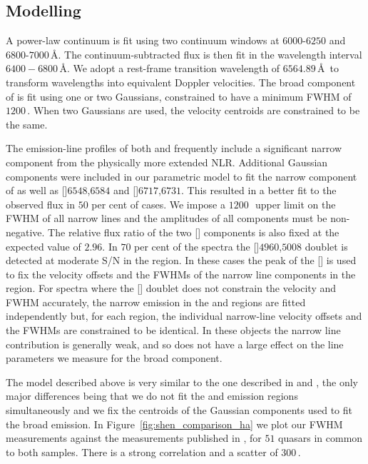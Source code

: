 \subsection{Modelling \ha}
\label{sec:ha}

A power-law continuum is fit using two continuum windows at $6000$-$6250$ and $6800$-$7000$\,\AA.
The continuum-subtracted flux is then fit in the wavelength interval $6400-6800$\,\AA.
We adopt a rest-frame transition wavelength of $6564.89$\,\AA\, to transform wavelengths into equivalent Doppler velocities.
The broad component of \ha is fit using one or two Gaussians, constrained to have a minimum FWHM of $1200$\,\kms. When two Gaussians are used, the velocity centroids are constrained to be the same.

The emission-line profiles of both \hb and \ha frequently include a significant narrow component from the physically more extended NLR.
Additional Gaussian components were included in our parametric model to fit the narrow component of \ha as well as []\ll$6548$,$6584$ and []\ll$6717$,$6731$.
This resulted in a better fit to the observed flux in $50$ per cent of cases.
We impose a $1200$\,\kms\, upper limit on the FWHM of all narrow lines and the amplitudes of all components must be non-negative.
The relative flux ratio of the two [] components is also fixed at the expected value of $2.96$.
In $70$ per cent of the spectra the []\ll$4960$,$5008$ doublet is detected at moderate S/N in the \hb region.
In these cases the peak of the [] is used to fix the velocity offsets and the FWHMs of the narrow line components in the \ha region.
For spectra where the [] doublet does not constrain the velocity and FWHM accurately, the narrow emission in the \ha and \hb regions are fitted independently but, for each region, the individual narrow-line velocity offsets and the FWHMs are constrained to be identical.
In these objects the narrow line contribution is generally weak, and so does not have a large effect on the line parameters we measure for the broad component.

The model described above is very similar to the one described in \citet{shen12} and \citet{shen11}, the only major differences being that we do not fit the \ha and \hb emission regions simultaneously and we fix the centroids of the Gaussian components used to fit the broad emission.
In Figure~\ref{fig:shen_comparison_ha} we plot our \ha FWHM measurements against the measurements published in \citet{shen12}, for $51$ quasars in common to both samples.
There is a strong correlation and a scatter of $300$\,\kms.

